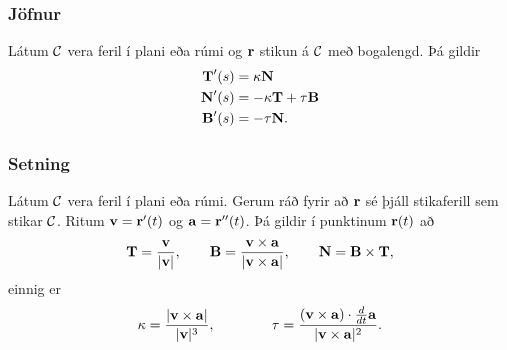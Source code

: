  \subsubsection{Jöfnur}
   Látum $\cal C$ vera feril í plani
eða rúmi og $\rv$ stikun á $\cal C$ með bogalengd.  Þá gildir 
\begin{align*}
\Tv'(s)&=\kappa\Nv\\
\Nv'(s)&=-\kappa\Tv+\tau\Bv\\
\Bv'(s)&=-\tau\Nv.
\end{align*}
 

 \subsubsection{Setning}
   Látum $\cal C$ vera feril í plani eða rúmi. 
Gerum ráð fyrir að $\rv$ sé þjáll stikaferill
sem stikar $\cal C$. Ritum $\vv=\rv'(t)$ og $\av=\rv''(t)$.
Þá gildir í punktinum $\rv(t)$ að
$$\Tv=\frac{\vv}{|\vv|},\qquad 
\Bv=\frac{\vv\times\av}{|\vv\times\av|},\qquad
\Nv=\Bv\times\Tv,$$
einnig er 
$$\kappa=\frac{|\vv\times\av|}{|\vv|^3},\qquad\qquad
\tau=\frac{(\vv\times\av)\cdot \frac{d}{dt}\av}{|\vv\times\av|^2}.$$

 




